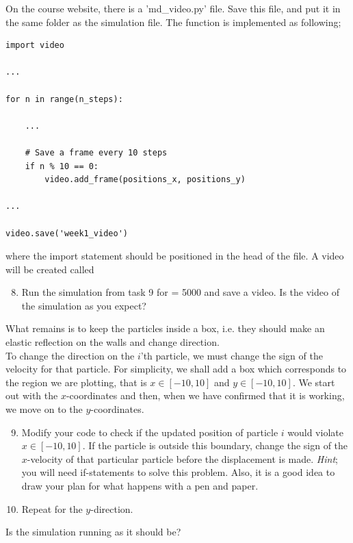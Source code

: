 \documentclass{article}
\begin{document}
On the course website, there is a 'md\_video.py' file.
Save this file, and put it in the same folder as the simulation file.
The function is implemented as following;

\begin{lstlisting}
import video

...

for n in range(n_steps):

    ...

    # Save a frame every 10 steps
    if n % 10 == 0:
        video.add_frame(positions_x, positions_y)

...

video.save('week1_video')

\end{lstlisting}

where the import statement should be positioned in the head of the file.
A video will be created called 

\begin{enumerate}
  \setcounter{enumi}{7}
  \item Run the simulation from task 9 for  = 5000 and save a video.
    Is the video of the simulation as you expect?

\end{enumerate}

What remains is to keep the particles inside a box, i.e. they should make an elastic reflection on the walls and change direction. \\

To change the direction on the $i$'th particle, we must change the sign of the velocity for that particle.
For simplicity, we shall add a box which corresponds to the region we are plotting, that is $x \in [-10,10]$ and $y \in [-10,10]$.
We start out with the $x$-coordinates and then, when we have confirmed that it is working, we move on to the $y$-coordinates.

\begin{enumerate}
  \setcounter{enumi}{8}
  \item Modify your code to check if the updated position of particle $i$ would violate $x \in [-10,10]$.
      If the particle is outside this boundary, change the sign of the $x$-velocity of that
      particular particle before the displacement is made.
      {\em Hint}; you will need if-statements to solve this problem. Also, it is a good idea to draw your plan for what happens with a pen and paper.

  \item Repeat for the $y$-direction.

\end{enumerate}

Is the simulation running as it should be?

\end{document}
